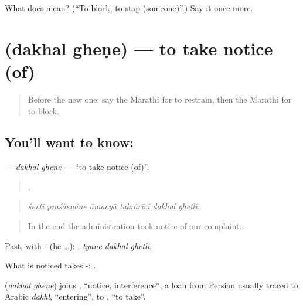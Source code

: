 \begin{tcolorbox}[breakable,colback=teal!4,colframe=teal!35!black,title={Before you move on}]
What does  mean? (\textquotedblleft{}To block; to stop (someone)\textquotedblright{}.) Say it once more.
\end{tcolorbox}
\section[\texorpdfstring{\mr{दखल} \mr{घेणे} (dakhal gheṇe)}{दखल घेणे (dakhal gheṇe)}]{  (dakhal gheṇe) — to take notice (of)}

\label{lesson:MR-C386-dakhal-ghene}



\begin{quote}
Before the new one: say the Marathi for to restrain, then the Marathi for to block.
\end{quote}

\subsection*{You'll want to know:  }
\textbf{ } — \emph{dakhal gheṇe} — \textquotedblleft{}to take notice (of)\textquotedblright{}.

\begin{quote}
     .
\end{quote}

\begin{quote}
\emph{śevṭī praśāsnāne āmacyā takrārīcī dakhal ghetlī.}
\end{quote}

\begin{quote}
In the end the administration took notice of our complaint.
\end{quote}

Past, with - (he …):   , \emph{tyāne dakhal ghetlī}.

What is noticed takes -:   .

\begin{cousinweb}
\textbf{ } (\emph{dakhal gheṇe}) joins , \textquotedblleft{}notice, interference\textquotedblright{}, a loan from Persian usually traced to Arabic \emph{dakhl}, \textquotedblleft{}entering\textquotedblright{}, to , \textquotedblleft{}to take\textquotedblright{}.
\end{cousinweb}

